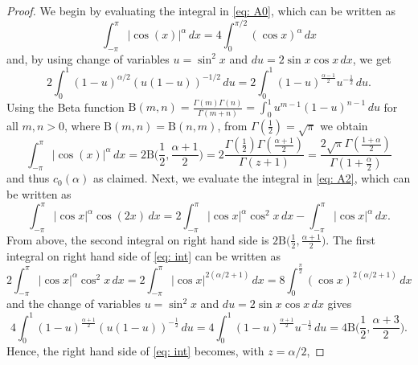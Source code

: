 \documentclass{article}
\numberwithin{equation}{section}
\begin{document}
		\begin{proof}		
		We begin by evaluating the integral in \eqref{eq: A0},  
		which can be written as
		\begin{equation*}
			\int_{-\pi}^{\pi}|\cos(x)|^{\alpha} \,dx = 4 \int_{0}^{\pi/2} (\cos x)^{\alpha} \,dx
		\end{equation*}
		and, by using change of variables $u=\sin^2x$ and $du = 2 \sin x \cos x \,dx$, we get
		\begin{equation*}
			2 \int_{0}^{1} (1-u)^{\alpha/2} (u(1-u))^{-1/2} \,du = 2 \int_{0}^{1} (1-u)^{\frac{\alpha-1}{2}}u^{-\frac{1}{2}} \,du .
		\end{equation*}
		 Using the Beta function \cite{andrews1999special}  $\text{B}(m,n) = \frac{\Gamma (m) \Gamma(n)}{\Gamma(m+n)} = \int_{0}^{1} u^{m-1}(1-u)^{n-1} \,du $ for all $m,n >0$, where $\text{B}(m,n) = \text{B}(n,m)$, from $\Gamma(\frac{1}{2}) = \sqrt{\pi}$ 
we obtain 
		\begin{equation}
			\int_{-\pi}^{\pi} |\cos(x)|^\alpha \,dx =
			2 \text{B} \biggl(\frac{1}{2}, \frac{\alpha+1}{2} \biggr) = 2 \frac{\Gamma (\frac{1}{2}) \Gamma (\frac{\alpha+1}{2})}{\Gamma(z+1)} = 
			\frac{2 \sqrt{\pi} \Gamma(\frac{1+\alpha}{2})}{\Gamma(1+\frac{\alpha}{2})}
		\end{equation} 
		and thus $c_0(\alpha)$ as claimed. 
		Next, we evaluate the integral in \eqref{eq: A2}, which can be written as 
		\begin{equation}\label{eq: int}
			\int_{-\pi}^{\pi} |\cos x|^{\alpha} \cos(2x) \,dx = 2\int_{-\pi}^{\pi} |\cos x|^{\alpha} \cos^2x \,dx - \int_{-\pi}^{\pi} |\cos x|^{\alpha} \,dx .
		\end{equation} 
		From above, the second integral on right hand side is $2\text{B} \bigl(\frac{1}{2}, \frac{\alpha+1}{2} \bigr)$. The first integral on right hand side of \eqref{eq: int} can be written as
		\begin{equation*}
			2\int_{-\pi}^{\pi} |\cos x|^{\alpha} \cos^2x \,dx = 2\int_{-\pi}^{\pi} |\cos x|^{2(\alpha/2+1)} \,dx = 8\int_{0}^{\frac{\pi}{2}} (\cos x)^{2(\alpha/2+1)} \,dx
		\end{equation*}		
		and the change of variables $u=\sin^2x$ and $du = 2\sin x \cos x \,dx $ gives
		\begin{equation}
			4 \int_{0}^{1} (1-u)^{\frac{\alpha+1}{2}} (u(1-u))^{-\frac{1}{2}} \,du = 4 \int_{0}^{1} (1-u)^{\frac{\alpha+1}{2}} u^{-\frac{1}{2}} \,du = 4 \text{B} \biggl(\frac{1}{2}, \frac{\alpha+3}{2} \biggr) .
		\end{equation}
		Hence, the right hand side of \eqref{eq: int} becomes, with $z=\alpha/2$, 

\end{proof}
\end{document}
